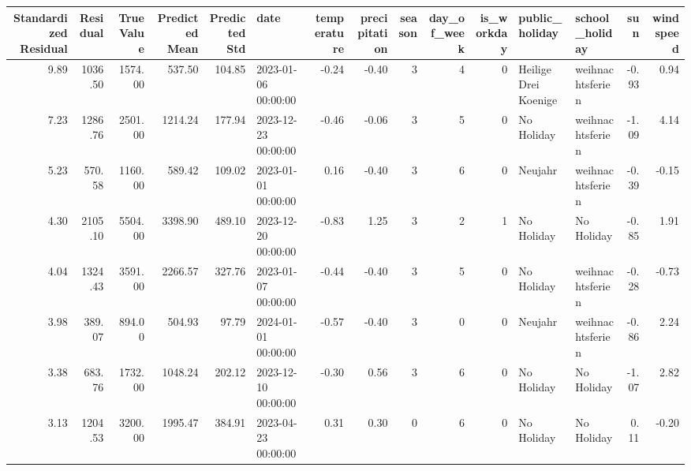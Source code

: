 \begin{tabular}{rrrrrlrrrrrllrr}
\toprule
Standardized Residual & Residual & True Value & Predicted Mean & Predicted Std & date & temperature & precipitation & season & day_of_week & is_workday & public_holiday & school_holiday & sun & windspeed \\
\midrule
9.89 & 1036.50 & 1574.00 & 537.50 & 104.85 & 2023-01-06 00:00:00 & -0.24 & -0.40 & 3 & 4 & 0 & Heilige Drei Koenige & weihnachtsferien & -0.93 & 0.94 \\
7.23 & 1286.76 & 2501.00 & 1214.24 & 177.94 & 2023-12-23 00:00:00 & -0.46 & -0.06 & 3 & 5 & 0 & No Holiday & weihnachtsferien & -1.09 & 4.14 \\
5.23 & 570.58 & 1160.00 & 589.42 & 109.02 & 2023-01-01 00:00:00 & 0.16 & -0.40 & 3 & 6 & 0 & Neujahr & weihnachtsferien & -0.39 & -0.15 \\
4.30 & 2105.10 & 5504.00 & 3398.90 & 489.10 & 2023-12-20 00:00:00 & -0.83 & 1.25 & 3 & 2 & 1 & No Holiday & No Holiday & -0.85 & 1.91 \\
4.04 & 1324.43 & 3591.00 & 2266.57 & 327.76 & 2023-01-07 00:00:00 & -0.44 & -0.40 & 3 & 5 & 0 & No Holiday & weihnachtsferien & -0.28 & -0.73 \\
3.98 & 389.07 & 894.00 & 504.93 & 97.79 & 2024-01-01 00:00:00 & -0.57 & -0.40 & 3 & 0 & 0 & Neujahr & weihnachtsferien & -0.86 & 2.24 \\
3.38 & 683.76 & 1732.00 & 1048.24 & 202.12 & 2023-12-10 00:00:00 & -0.30 & 0.56 & 3 & 6 & 0 & No Holiday & No Holiday & -1.07 & 2.82 \\
3.13 & 1204.53 & 3200.00 & 1995.47 & 384.91 & 2023-04-23 00:00:00 & 0.31 & 0.30 & 0 & 6 & 0 & No Holiday & No Holiday & 0.11 & -0.20 \\
\bottomrule
\end{tabular}

